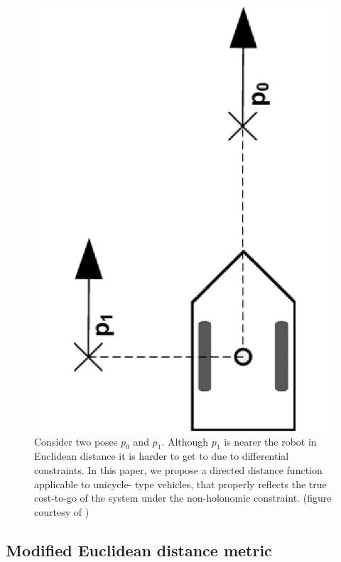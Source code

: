 \begin{figure}
  \includegraphics[scale=.3,angle=-90]{figures/rrtfunnel/non-holonomic-vehicle-euclidean-weakness}
  \caption{Consider two poses \(p_0\) and \(p_1\). Although \(p_1\) is nearer
    the robot in Euclidean distance it is harder to get to due to differential
    constraints. In this paper, we propose a directed distance function
    applicable to unicycle- type vehicles, that properly reflects the true
    cost-to-go of the system under the non-holonomic constraint. (figure
    courtesy of \cite{parkFeedbackMotionPlanning2015})}
\label{fig:non-holonomic-vehicle-euclidean-weakness}
\end{figure}

\subsection{Modified Euclidean distance metric}

